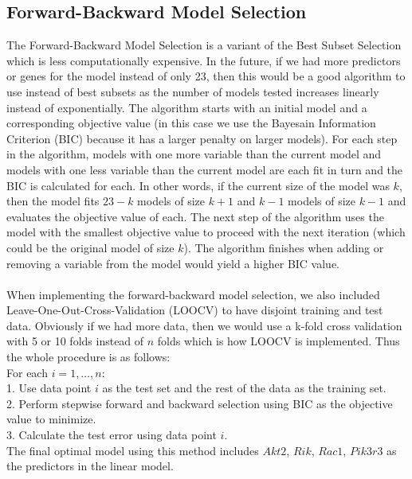 \documentclass{article}
\begin{document}
\subsection{Forward-Backward Model Selection}
The Forward-Backward Model Selection is a variant of the Best Subset Selection which is less computationally expensive.  In the future, if we had more predictors or genes for the model instead of only 23, then this would be a good algorithm to use instead of best subsets as the number of models tested increases linearly instead of exponentially.  The algorithm starts with an initial model and a corresponding objective value (in this case we use the Bayesain Information Criterion (BIC) because it has a larger penalty on larger models).  For each step in the algorithm, models with one more variable than the current model and models with one less variable than the current model are each fit in turn and the BIC is calculated for each.  In other words, if the current size of the model was $k$, then the model fits $23-k$ models of size $k+1$ and $k-1$ models of size $k-1$ and evaluates the objective value of each.  The next step of the algorithm uses the model with the smallest objective value to proceed with the next iteration (which could be the original model of size $k$).  The algorithm finishes when adding or removing a variable from the model would yield a higher BIC value.\\
\null\\
When implementing the forward-backward model selection, we also included Leave-One-Out-Cross-Validation (LOOCV) to have disjoint training and test data.  Obviously if we had more data, then we would use a k-fold cross validation with 5 or 10 folds instead of $n$ folds which is how LOOCV is implemented.  Thus the whole procedure is as follows:\\
\newpage
For each $i=1,\dots, n$:\\
1. Use data point $i$ as the test set and the rest of the data as the training set.\\
2. Perform stepwise forward and backward selection using BIC as the objective value to minimize.\\
3. Calculate the test error using data point $i$. \\
The final optimal model using this method includes $Akt2$, $Rik$, $Rac1$, $Pik3r3$ as the predictors in the linear model.
\end{document}

